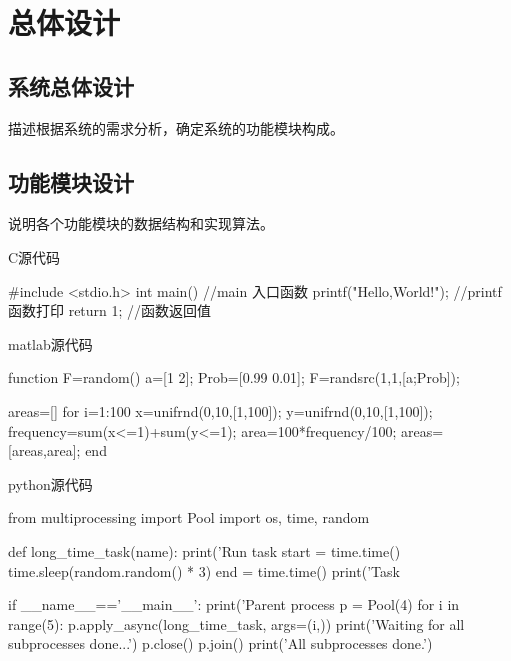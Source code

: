 

\chapter{总体设计}

\section{系统总体设计}
描述根据系统的需求分析，确定系统的功能模块构成。

\section{功能模块设计}
说明各个功能模块的数据结构和实现算法。


C源代码
\begin{clan}
    #include <stdio.h>  
    int main()                  //main 入口函数  
    {  
        printf("Hello,World!"); //printf 函数打印  
        return 1;               //函数返回值  
    }   
\end{clan}


matlab源代码
    \begin{matlab}
    function F=random()
    a=[1 2];
    Prob=[0.99 0.01];
    F=randsrc(1,1,[a;Prob]);

    areas=[]
    for i=1:100
    x=unifrnd(0,10,[1,100]);
    y=unifrnd(0,10,[1,100]);
    frequency=sum(x<=1)+sum(y<=1);
    area=100*frequency/100;
    areas=[areas,area];
    end
\end{matlab}


python源代码
\begin{python}
    from multiprocessing import Pool
    import os, time, random

    def long_time_task(name):
        print('Run task %
        start = time.time()
        time.sleep(random.random() * 3)
        end = time.time()
        print('Task %

    if __name__=='__main__':
        print('Parent process %
        p = Pool(4)
        for i in range(5):
        p.apply_async(long_time_task, args=(i,))
        print('Waiting for all subprocesses done...')
        p.close()
        p.join()
        print('All subprocesses done.')
\end{python}




